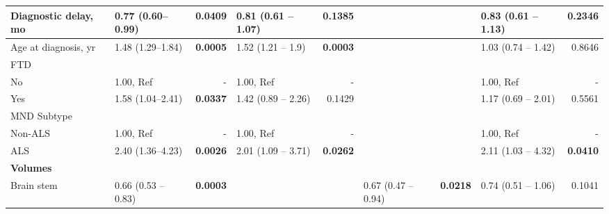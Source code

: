 \begin{sidewaystable}
{\begin{tabular}{|l|lr|lr|lr|lr|}
\hline
Diagnostic delay, mo & 0.77 (0.60--0.99) & \textbf{0.0409} & \textcolor[rgb]{0.2,0.2,0.2}{0.81 (0.61 -- 1.07)} & \textcolor[rgb]{0.2,0.2,0.2}{0.1385} & {\cellcolor[rgb]{0.753,0.753,0.753}} & {\cellcolor[rgb]{0.753,0.753,0.753}} & \textcolor[rgb]{0.2,0.2,0.2}{0.83 (0.61 -- 1.13)} & \textcolor[rgb]{0.2,0.2,0.2}{0.2346} \\ 
\hline
Age at diagnosis, yr & 1.48 (1.29--1.84) & \textbf{0.0005} & \textcolor[rgb]{0.2,0.2,0.2}{1.52 (1.21 -- 1.9)} & \textcolor[rgb]{0.2,0.2,0.2}{\textbf{0.0003}} & {\cellcolor[rgb]{0.753,0.753,0.753}} & {\cellcolor[rgb]{0.753,0.753,0.753}} & \textcolor[rgb]{0.2,0.2,0.2}{1.03 (0.74 -- 1.42)} & \textcolor[rgb]{0.2,0.2,0.2}{0.8646} \\ 
\hline
FTD &  &  &  &  & {\cellcolor[rgb]{0.753,0.753,0.753}} & {\cellcolor[rgb]{0.753,0.753,0.753}} &  &  \\
\hspace{5mm}No & 1.00, Ref & - & 1.00, Ref & - & {\cellcolor[rgb]{0.753,0.753,0.753}} & {\cellcolor[rgb]{0.753,0.753,0.753}} & 1.00, Ref & - \\
\hspace{5mm}Yes & 1.58 (1.04--2.41) & \textbf{0.0337} & \textcolor[rgb]{0.2,0.2,0.2}{1.42 (0.89 -- 2.26)} & \textcolor[rgb]{0.2,0.2,0.2}{0.1429} & {\cellcolor[rgb]{0.753,0.753,0.753}} & {\cellcolor[rgb]{0.753,0.753,0.753}} & \textcolor[rgb]{0.2,0.2,0.2}{1.17 (0.69 -- 2.01)} & \textcolor[rgb]{0.2,0.2,0.2}{0.5561} \\ 
\hline
MND Subtype &  &  &  &  & {\cellcolor[rgb]{0.753,0.753,0.753}} & {\cellcolor[rgb]{0.753,0.753,0.753}} &  &  \\
\hspace{5mm}Non-ALS & 1.00, Ref & - & 1.00, Ref & - & {\cellcolor[rgb]{0.753,0.753,0.753}} & {\cellcolor[rgb]{0.753,0.753,0.753}} & 1.00, Ref & - \\
\hspace{5mm}ALS & 2.40 (1.36--4.23) & \textbf{0.0026} & \textcolor[rgb]{0.2,0.2,0.2}{2.01 (1.09 -- 3.71)} & \textcolor[rgb]{0.2,0.2,0.2}{\textbf{0.0262}} & {\cellcolor[rgb]{0.753,0.753,0.753}} & {\cellcolor[rgb]{0.753,0.753,0.753}} & \textcolor[rgb]{0.2,0.2,0.2}{2.11 (1.03 -- 4.32)} & \textcolor[rgb]{0.2,0.2,0.2}{\textbf{0.0410}} \\ 
\hline
\multicolumn{1}{|l}{\textbf{Volumes}} &  & \multicolumn{1}{l}{} &  & \multicolumn{1}{l}{} &  & \multicolumn{1}{l}{} &  &  \\ 
\hline
Brain stem & \textcolor[rgb]{0.2,0.2,0.2}{0.66 (0.53 -- 0.83)} & \textcolor[rgb]{0.2,0.2,0.2}{\textbf{0.0003}} & {\cellcolor[rgb]{0.753,0.753,0.753}} & {\cellcolor[rgb]{0.753,0.753,0.753}} & \textcolor[rgb]{0.2,0.2,0.2}{0.67 (0.47 -- 0.94)} & \textcolor[rgb]{0.2,0.2,0.2}{\textbf{0.0218}} & \textcolor[rgb]{0.2,0.2,0.2}{0.74 (0.51 -- 1.06)} & \textcolor[rgb]{0.2,0.2,0.2}{0.1041} \\ 

\end{tabular}}
\end{sidewaystable}
